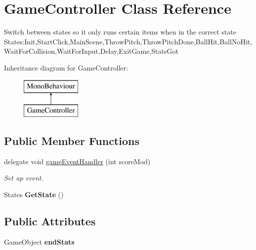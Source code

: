 \hypertarget{class_game_controller}{}\section{Game\+Controller Class Reference}
\label{class_game_controller}


Switch between states so it only runs certain items when in the correct state States\+:Init,Start\+Click,Main\+Scene,Throw\+Pitch,Throw\+Pitch\+Done,Ball\+Hit,Ball\+No\+Hit,Wait\+For\+Collision,Wait\+For\+Input,Delay,Exit\+Game,Stats\+Got  


Inheritance diagram for Game\+Controller\+:\begin{figure}[H]
\begin{center}
\leavevmode
\includegraphics[height=2.000000cm]{class_game_controller}
\end{center}
\end{figure}
\subsection*{Public Member Functions}
\begin{DoxyCompactItemize}
\item 
delegate void \hyperlink{class_game_controller_a5729636ec46fe598b2ee7515df81b216}{game\+Event\+Handler} (int score\+Mod)\hypertarget{class_game_controller_a5729636ec46fe598b2ee7515df81b216}{}\label{class_game_controller_a5729636ec46fe598b2ee7515df81b216}

\begin{DoxyCompactList}\small\item\em Set up event. \end{DoxyCompactList}\item 
States {\bfseries Get\+State} ()\hypertarget{class_game_controller_a699a9e7d594774992e69abeb125a3dbd}{}\label{class_game_controller_a699a9e7d594774992e69abeb125a3dbd}

\end{DoxyCompactItemize}
\subsection*{Public Attributes}
\begin{DoxyCompactItemize}
\item 
Game\+Object {\bfseries end\+Stats}\hypertarget{class_game_controller_a3f976dbbc6dc33239f3b99f769b758e3}{}\label{class_game_controller_a3f976dbbc6dc33239f3b99f769b758e3}

\end{DoxyCompactItemize}
